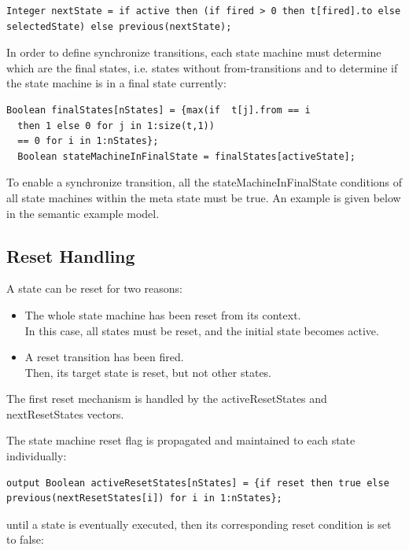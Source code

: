 \documentclass[10pt,a4paper]{report}
\def\doublelabel#1{\label{#1}\hypertarget{#1}{}}
\begin{document}
\begin{lstlisting}[language=modelica]
  Integer nextState = if active then (if fired > 0 then t[fired].to else selectedState) else previous(nextState);
\end{lstlisting}
In order to define synchronize transitions, each state machine must
determine which are the final states, i.e. states without
from-transitions and to determine if the state machine is in a final
state currently:

\begin{lstlisting}[language=modelica]
  Boolean finalStates[nStates] = {max(if  t[j].from == i
  then 1 else 0 for j in 1:size(t,1))
  == 0 for i in 1:nStates};
  Boolean stateMachineInFinalState = finalStates[activeState];
\end{lstlisting}
To enable a synchronize transition, all the stateMachineInFinalState
conditions of all state machines within the meta state must be true. An
example is given below in the semantic example model.

\subsection{Reset Handling}\doublelabel{reset-handling}

A state can be reset for two reasons:

\begin{itemize}
\item
  The whole state machine has been reset from its context.\\
  In this case, all states must be reset, and the initial state becomes
  active.
\item
  A reset transition has been fired.\\
  Then, its target state is reset, but not other states.
\end{itemize}

The first reset mechanism is handled by the activeResetStates and
nextResetStates vectors.

The state machine reset flag is propagated and maintained to each state
individually:

\begin{lstlisting}[language=modelica]
  output Boolean activeResetStates[nStates] = {if reset then true else previous(nextResetStates[i]) for i in 1:nStates};
\end{lstlisting}
until a state is eventually executed, then its corresponding reset
condition is set to false:
\end{document}
